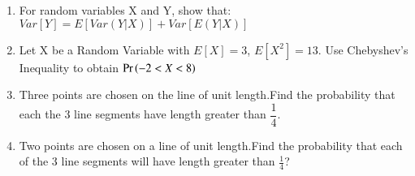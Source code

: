 \renewcommand{\theequation}{\theenumi}
\renewcommand{\thefigure}{\theenumi}
\renewcommand{\thetable}{\theenumi}
\begin{enumerate}[label=\thesection.\arabic*.,ref=\thesection.\theenumi]
%


\item For random variables X and Y, show that:
$Var[Y] = E[Var(Y|X)] + Var[E(Y|X)]$
%
\solution

%
\item Let X be a Random Variable with $E[X] = 3$, $E[X^2] = 13$. Use Chebyshev's Inequality to obtain $\Pr\left(-2 < X < 8\right)$
%
\\
\solution

%
\item  Three points are chosen on the line of unit length.Find the probability that each the 3 line segments have length greater than $\dfrac{1}{4}$.
\\
\solution

%
\item Two points are chosen on a line of unit length.Find the probability that each of the 3 line segments will have length greater than $\frac{1}{4}$?
\\
\solution


\end{enumerate}
